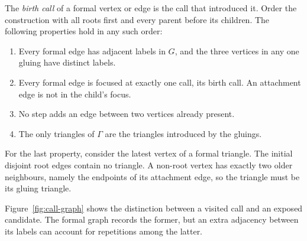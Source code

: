 The \emph{birth call} of a formal vertex or edge is the call that
introduced it.  Order the construction with all roots first and every
parent before its children.  The following properties hold in any such
order:
\begin{enumerate}[label=(\roman*)]
\item Every formal edge has adjacent labels in $G$, and the three
vertices in any one gluing have distinct labels.
\item Every formal edge is focused at exactly one call, its birth
call.  An attachment edge is not in the child's focus.
\item No step adds an edge between two vertices already present.
\item The only triangles of $\Gamma$ are the triangles introduced by
the gluings.
\end{enumerate}
For the last property, consider the latest vertex of a formal
triangle.  The initial disjoint root edges contain no triangle.  A
non-root vertex has exactly two older neighbours, namely the endpoints
of its attachment edge, so the triangle must be its gluing triangle.

Figure~\ref{fig:call-graph} shows the distinction between a visited call
and an exposed candidate. The formal graph records the former, but an
extra adjacency between its labels can account for repetitions among
the latter.

